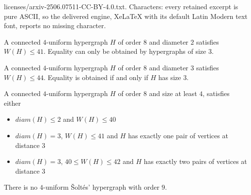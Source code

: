 \documentclass[10pt,a4paper]{amsart}
\newcommand{\diam}{diam}
\begin{document}
licenses/arxiv-2506.07511-CC-BY-4.0.txt. Characters: every retained excerpt is pure ASCII, so the delivered engine, XeLaTeX with its default Latin Modern text font, reports no missing character.
\begin{cor}\label{cor:maxWfordiam2}
    A connected $4$-uniform hypergraph $H$ of order $8$ and diameter $2$ satisfies $W(H) \le 41.$
    Equality can only be obtained by hypergraphs of size $3.$
\end{cor}

\begin{lem}\label{lem:Wle44}
    A connected $4$-uniform hypergraph $H$ of order $8$ and diameter $3$ satisfies $W(H) \le 44.$
    Equality is obtained if and only if $H$ has size $3.$
\end{lem}

 \begin{lem}\label{lem:Wbound}
        A connected $4$-uniform hypergraph $H$ of order $8$ and size at least $4$, satisfies either 
        \begin{itemize}
            \item $\diam (H) \le 2$ and $W(H) \le 40$
            \item $\diam (H)  =3$, $W(H)\le 41$ and $H$ has exactly one pair of vertices at distance $3$ 
            \item $\diam(H)  =3$, $40\le W(H) \le 42$ and $H$ has exactly two pairs of vertices at distance $3$ 
        \end{itemize}
    \end{lem}

\begin{thm}\label{thm:no4unif_n9}
     There is no $4$-uniform \v Solt\'es' hypergraph with order $9$.
\end{thm}
\end{document}
